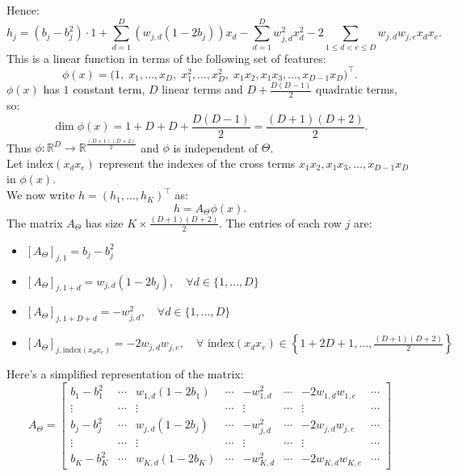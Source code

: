 \documentclass[12pt,a4paper]{article}
\begin{document}
        Hence:
        \[
        h_j = (b_j - b_j^2) \cdot 1 
        + \sum_{d=1}^D (w_{j,d}(1 - 2b_j)) x_d
        - \sum_{d=1}^D w_{j,d}^2 x_d^2
        - 2 \sum_{1 \leq d < e \leq D} w_{j,d} w_{j,e} x_d x_e.
        \]
        This is a linear function in terms of the following set of features:
        \[\phi(x) = \bigl(1,\; x_1,\ldots,x_D,\; x_1^2,\ldots,x_D^2,\; x_1x_2, x_1x_3,\ldots,x_{D-1}x_D \bigr)^\top.\]
        \(\phi(x)\) has \(1\) constant term, \(D\) linear terms and \(D + \frac{D(D-1)}{2}\) quadratic terms, so:
        \[\dim\phi(x) = 1 + D + D + \frac{D(D-1)}{2} = \frac{(D+1)(D+2)}{2}.\]
        Thus \(\phi: \mathbb{R}^D \to \mathbb{R}^{\frac{(D+1)(D+2)}{2}}\) and \(\phi\) is independent of \(\Theta\). \\
        Let \(\text{index}(x_d x_e)\) represent the indexes of the cross terms \(x_1x_2,x_1x_3,\ldots,x_{D-1}x_D\) in \(\phi(x)\). \\
        We now write \(h = (h_1,\ldots,h_K)^\top\) as:
        \[h = A_{\Theta} \phi(x).\]
        The matrix \(A_{\Theta}\) has size \(K \times \frac{(D+1)(D+2)}{2}\). The entries of each row \(j\) are:
        \begin{itemize}
            \item \([A_{\Theta}]_{j,1} = b_j - b_j^2\)
            \item \([A_{\Theta}]_{j,1+d} = w_{j,d}(1 - 2b_j), \quad \forall d \in \{1,\ldots,D\}\)
            \item \([A_{\Theta}]_{j,1+D+d} = -w_{j,d}^2, \quad \forall d \in \{1,\ldots,D\}\)
            \item \([A_{\Theta}]_{j,\text{index}(x_d x_e)} = -2 w_{j,d} w_{j,e}, \quad \forall \text{ index}(x_d x_e) \in \left\{1+2D+1,\ldots,\frac{(D+1)(D+2)}{2}\right\}\)
        \end{itemize}
        Here's a simplified representation of the matrix:
        \[
        A_{\Theta} =
        \begin{bmatrix}
        b_1 - b_1^2 & \cdots & w_{1,d}(1 - 2b_1) & \cdots & -w_{1,d}^2 & \cdots & -2 w_{1,d} w_{1,e} & \cdots \\
        \vdots      & \cdots & \vdots            & \cdots & \vdots     & \cdots & \vdots             & \cdots \\
        b_j - b_j^2 & \cdots & w_{j,d}(1 - 2b_j) & \cdots & -w_{j,d}^2 & \cdots & -2 w_{j,d} w_{j,e} & \cdots \\
        \vdots      & \cdots & \vdots            & \cdots & \vdots     & \cdots & \vdots             & \cdots \\
        b_K - b_K^2 & \cdots & w_{K,d}(1 - 2b_K) & \cdots & -w_{K,d}^2 & \cdots & -2 w_{K,d} w_{K,e} & \cdots
        \end{bmatrix}
        \]
\end{document}
